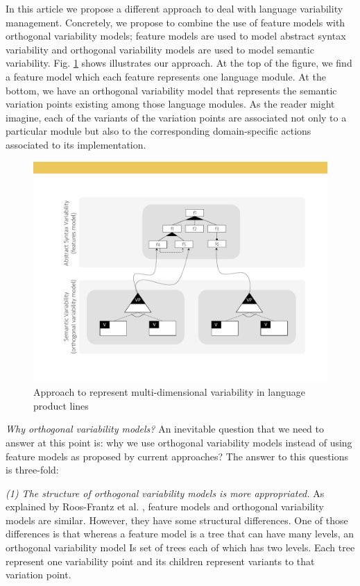 In this article we propose a different approach to deal with language variability management. Concretely, we propose to combine the use of feature models with orthogonal variability models; feature models are used to model abstract syntax variability and orthogonal variability models are used to model semantic variability. Fig. \ref{fig:languages-variability-modeling} shows illustrates our approach. At the top of the figure, we find a feature model which each feature represents one language module. At the bottom, we have an orthogonal variability model that represents the semantic variation points existing among those language modules. As the reader might imagine, each of the variants of the variation points are associated not only to a particular module but also to the corresponding domain-specific actions associated to its implementation. 

\begin{figure}
  \centering\includegraphics[width=0.84\linewidth]{images/languages-variability-modeling-fig}
  \caption{Approach to represent multi-dimensional variability in language product lines}
  \label{fig:languages-variability-modeling}
\end{figure}

\vspace{2mm}
\textit{Why orthogonal variability models?} An inevitable question that we need to answer at this point is: why we use orthogonal variability models instead of using feature models as proposed by current approaches? The answer to this questions is three-fold:

\vspace{2mm}
\textit{(1) The structure of orthogonal variability models is more appropriated.} As explained by Roos-Frantz et al. \cite{Roos-Frantz:2012}, feature models and orthogonal variability models are similar. However, they have some structural differences. One of those differences is that whereas a feature model is a tree that can have many levels, an orthogonal variability model Is set of trees each of which has two levels. Each tree represent one variability point and its children represent variants to that variation point. 

